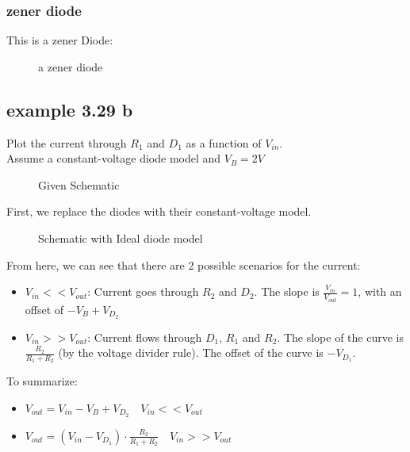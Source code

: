 \documentclass[11ypt]{extarticle}
\begin{document}
\subsubsection{zener diode}

This is a zener Diode:

\begin{figure}[H]{} 
    \centering
    
    \caption{a zener diode}
\end{figure}

\subsection{example 3.29 b}

Plot the current through $R_1$ and $D_1$ as a function of $V_{in}$.\\
Assume a constant-voltage diode model and $V_B = 2 \si{V}$

\begin{figure}[H]{} 
    \centering
    
    \caption{Given Schematic}
\end{figure}

First, we replace the diodes with their constant-voltage model.

\begin{figure}[H]{} 
    \centering
    
    \caption{Schematic with Ideal diode model}
\end{figure}

From here, we can see that there are 2 possible scenarios for the current:

\begin{itemize}
	\item $V_{in} << V_{out}$: Current goes through $R_2$ and $D_2$. The slope is $\frac{V_{in}}{V_{out}} = 1$, with an offset of $- V_B + V_{D_2}$
	\item $V_{in} >> V_{out}$: Current flows through $D_1$, $R_1$ and $R_2$. The slope of the curve is $\frac{R_2}{R_1 + R_2}$ (by the voltage divider rule). The offset of the curve is $- V_{D_1}$. 
\end{itemize}

To summarize: 

\begin{itemize}
	\item $V_{out} = V_{in} - V_B + V_{D_2} \quad	V_{in} << V_{out}$
	\item $V_{out} = (V_{in} - V_{D_1}) \cdot \frac{R_2}{R_1 + R_2} \quad	V_{in} >> V_{out}$
\end{itemize}
\end{document}
